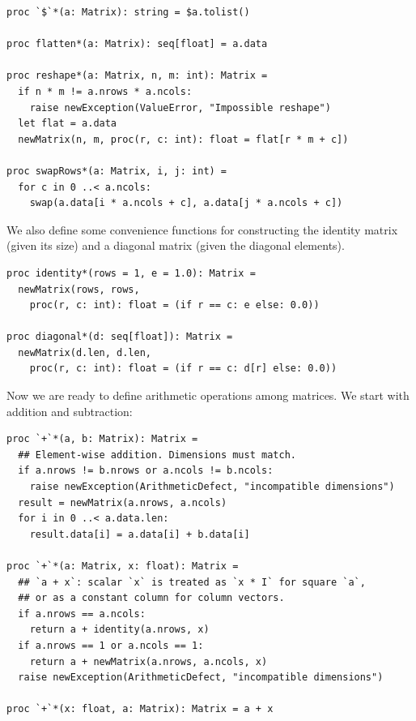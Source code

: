 \documentclass[justified, sixbynine]{tufte-book}
\def\ft{\small\tt}
\theoremstyle{plain}%
\newtheorem * {corollary}{Corollary}
\theoremstyle{definition}
\theoremstyle{remark}
\newtheorem * {remark}{Remark}
\newtheorem * {note}{Note}
\begin{document}
\begin{fullwidth}
\begin{lstlisting}[caption={in file: {\ft nlib/matrix.nim}}]
proc `$`*(a: Matrix): string = $a.tolist()

proc flatten*(a: Matrix): seq[float] = a.data

proc reshape*(a: Matrix, n, m: int): Matrix =
  if n * m != a.nrows * a.ncols:
    raise newException(ValueError, "Impossible reshape")
  let flat = a.data
  newMatrix(n, m, proc(r, c: int): float = flat[r * m + c])

proc swapRows*(a: Matrix, i, j: int) =
  for c in 0 ..< a.ncols:
    swap(a.data[i * a.ncols + c], a.data[j * a.ncols + c])
\end{lstlisting}


We also define some convenience functions for constructing the identity matrix (given its size) and a diagonal matrix (given the diagonal elements).

\begin{lstlisting}[caption={in file: {\ft nlib/matrix.nim}}]
proc identity*(rows = 1, e = 1.0): Matrix =
  newMatrix(rows, rows,
    proc(r, c: int): float = (if r == c: e else: 0.0))

proc diagonal*(d: seq[float]): Matrix =
  newMatrix(d.len, d.len,
    proc(r, c: int): float = (if r == c: d[r] else: 0.0))
\end{lstlisting}

Now we are ready to define arithmetic operations among matrices. We start with addition and subtraction:


\begin{lstlisting}[caption={in file: {\ft nlib/matrix.nim}}]
proc `+`*(a, b: Matrix): Matrix =
  ## Element-wise addition. Dimensions must match.
  if a.nrows != b.nrows or a.ncols != b.ncols:
    raise newException(ArithmeticDefect, "incompatible dimensions")
  result = newMatrix(a.nrows, a.ncols)
  for i in 0 ..< a.data.len:
    result.data[i] = a.data[i] + b.data[i]

proc `+`*(a: Matrix, x: float): Matrix =
  ## `a + x`: scalar `x` is treated as `x * I` for square `a`,
  ## or as a constant column for column vectors.
  if a.nrows == a.ncols:
    return a + identity(a.nrows, x)
  if a.nrows == 1 or a.ncols == 1:
    return a + newMatrix(a.nrows, a.ncols, x)
  raise newException(ArithmeticDefect, "incompatible dimensions")

proc `+`*(x: float, a: Matrix): Matrix = a + x


\end{lstlisting}
\end{fullwidth}
\end{document}

